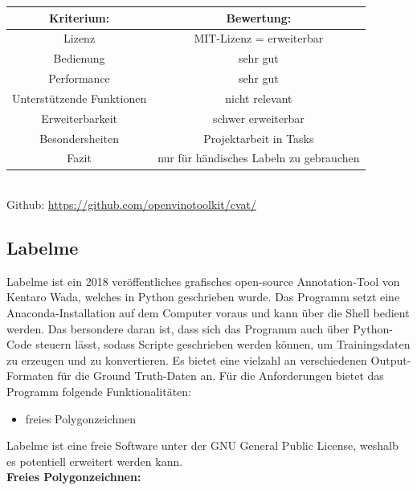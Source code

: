 \documentclass[11pt]{scrartcl}
\begin{document}
\noindent 
\begin{tabular}[h]{c|c}
Kriterium: & Bewertung:\\
\hline
Lizenz & MIT-Lizenz = erweiterbar\\
Bedienung & sehr gut \\
Performance & sehr gut\\
Unterstützende Funktionen & nicht relevant\\
Erweiterbarkeit & schwer erweiterbar\\
Besondersheiten & Projektarbeit in Tasks\\
\hline
Fazit & nur für händisches Labeln zu gebrauchen
\end{tabular}
\\


\noindent
Github: \url{https://github.com/openvinotoolkit/cvat/} 

\subsection{Labelme}
\label{sec:Labelme}

Labelme ist ein 2018 veröffentliches grafisches open-source Annotation-Tool von Kentaro Wada, welches in Python geschrieben wurde. Das Programm setzt eine Anaconda-Installation auf dem Computer voraus und kann über die Shell bedient werden. Das bersondere daran ist, dass sich das Programm auch über Python-Code steuern lässt, sodass  Scripte geschrieben werden können, um Trainingsdaten zu erzeugen und zu konvertieren. Es bietet eine vielzahl an verschiedenen Output-Formaten für die Ground Truth-Daten an. 
\noindent
Für die Anforderungen bietet das Programm folgende Funktionalitäten:
\begin{itemize}
	\item freies Polygonzeichnen
\end{itemize}
Labelme ist eine freie Software unter der GNU General Public License, weshalb es potentiell erweitert werden kann.
\\

\noindent
\textbf{Freies Polygonzeichnen:} 
\\
\end{document}
